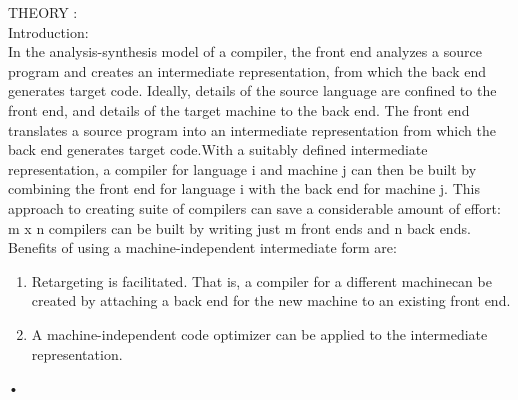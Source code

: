 \documentclass[11pt]{article}
\begin{document}
	
	\noindent
	THEORY :\\
	Introduction:\\
	In the analysis-synthesis model of a compiler, the front end analyzes a source program and creates an intermediate representation, from which the back end generates target code. Ideally, details of the source language are confined to the front end, and details of the target machine to the back end. The front end translates a source program into an intermediate representation from which the back end generates target code.With a suitably defined intermediate representation, a compiler for language i and machine j can then be built by combining the front end for language i with the back end for machine j. This approach to creating suite of compilers can save a considerable amount of effort: m x n compilers can be built by writing just m front ends and n back ends.\\
	
	\noindent
	Benefits of using a machine-independent intermediate form are:\\
	\begin{enumerate}
		\item Retargeting is facilitated. That is, a compiler for a different machinecan be created by attaching a back end for the new machine to an existing front end.
		\item A machine-independent code optimizer can be applied to the intermediate representation.
	\end{enumerate}•
	
\end{document}
